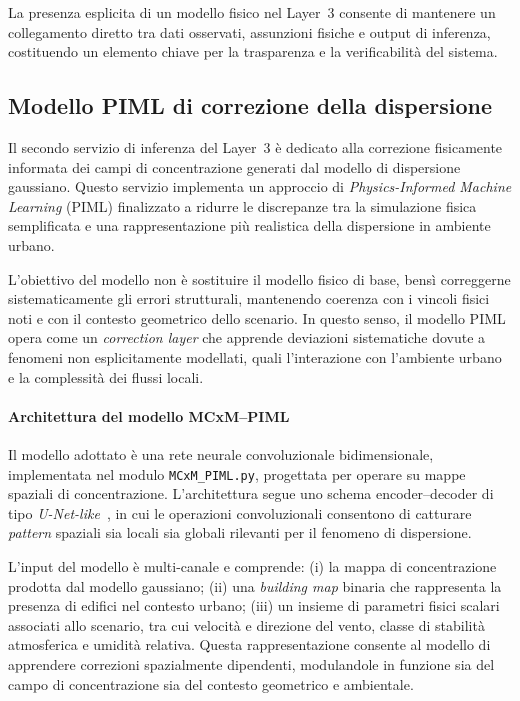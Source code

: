 La presenza esplicita di un modello fisico nel Layer~3 consente di mantenere un collegamento diretto tra dati osservati, assunzioni fisiche e output di inferenza, costituendo un elemento chiave per la trasparenza e la verificabilità del sistema.

\subsection{Modello PIML di correzione della dispersione}
\label{sec:layer3_piml_correction}

Il secondo servizio di inferenza del Layer~3 è dedicato alla correzione fisicamente informata dei campi di concentrazione generati dal modello di dispersione gaussiano.
Questo servizio implementa un approccio di \emph{Physics-Informed Machine Learning} (PIML) finalizzato a ridurre le discrepanze tra la simulazione fisica semplificata e una rappresentazione più realistica della dispersione in ambiente urbano.

L’obiettivo del modello non è sostituire il modello fisico di base, bensì correggerne sistematicamente gli errori strutturali, mantenendo coerenza con i vincoli fisici noti e con il contesto geometrico dello scenario.
In questo senso, il modello PIML opera come un \emph{correction layer} che apprende deviazioni sistematiche dovute a fenomeni non esplicitamente modellati, quali l’interazione con l’ambiente urbano e la complessità dei flussi locali.

\paragraph{Architettura del modello MCxM--PIML}

Il modello adottato è una rete neurale convoluzionale bidimensionale, implementata nel modulo \texttt{MCxM\_PIML.py}, progettata per operare su mappe spaziali di concentrazione.
L’architettura segue uno schema encoder--decoder di tipo \emph{U-Net-like}~\cite{ronneberger_unet}, in cui le operazioni convoluzionali consentono di catturare \textit{pattern} spaziali sia locali sia globali rilevanti per il fenomeno di dispersione.

L’input del modello è multi-canale e comprende:
(i) la mappa di concentrazione prodotta dal modello gaussiano;
(ii) una \emph{building map} binaria che rappresenta la presenza di edifici nel contesto urbano;
(iii) un insieme di parametri fisici scalari associati allo scenario, tra cui velocità e direzione del vento, classe di stabilità atmosferica e umidità relativa.
Questa rappresentazione consente al modello di apprendere correzioni spazialmente dipendenti, modulandole in funzione sia del campo di concentrazione sia del contesto geometrico e ambientale.

